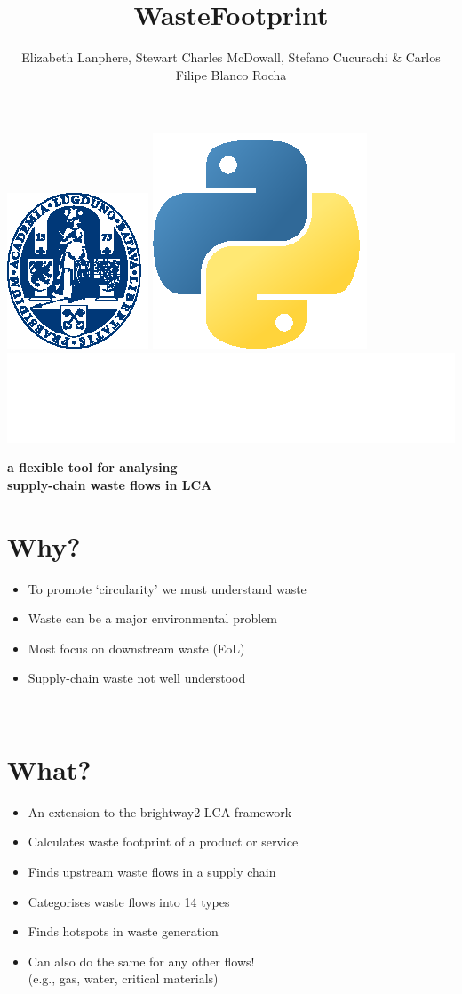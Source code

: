 \documentclass[a0paper,fleqn]{betterposter}
\begin{document}
{{\includegraphics[height=0.1\textwidth]{img/logoUL_white}\hfill
\includegraphics[height=0.07\textwidth]{img/python}\hfill
\includegraphics[height=0.07\textwidth]{img/brightway}\hfill
}

}{

\title{WasteFootprint}
{\selectfont\textbf{a flexible tool for analysing\\ supply-chain waste flows in LCA}}\\

\vspace{10pt}
\author{Elizabeth Lanphere, Stewart Charles McDowall, Stefano Cucurachi \& Carlos Filipe Blanco Rocha}
\vspace{30pt}

\section{Why?}
\begin{itemize}
    \item To promote `circularity' we must understand waste  
    \item Waste can be a major environmental problem
    \item Most focus on downstream waste (EoL)
    \item Supply-chain waste not well understood
\end{itemize}\\

\section{What?}
\begin{itemize}
\item An extension to the brightway2 LCA framework
\item Calculates waste footprint of a product or service
\item Finds upstream waste flows in a supply chain
\item Categorises waste flows into 14 types
\item Finds hotspots in waste generation
\item Can also do the same for any other flows! \\(e.g., gas, water, critical materials)
\end{itemize}\\

}
\end{document}
